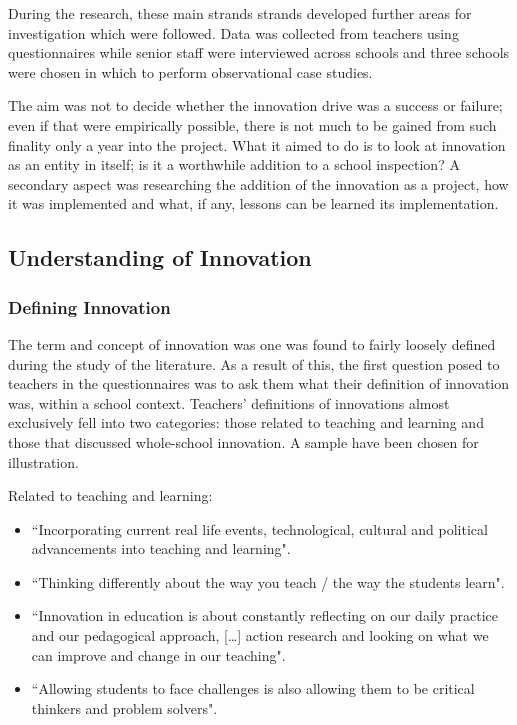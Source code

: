 \documentclass[11pt]{article}
\begin{document}
During the research, these main strands strands developed further areas for investigation which were followed. Data was collected from teachers using questionnaires while senior staff were interviewed across schools and three schools were chosen in which to perform observational case studies.

The aim was not to decide whether the innovation drive was a success or failure; even if that were empirically possible, there is not much to be gained from such finality only a year into the project. What it aimed to do is to look at innovation as an entity in itself; is it a worthwhile addition to a school inspection? A secondary aspect was researching the addition of the innovation as a project, how it was implemented and what, if any, lessons can be learned its implementation.

\subsection{Understanding of Innovation}
\subsubsection{Defining Innovation}
The term and concept of innovation was one was found to fairly loosely defined during the study of the literature. As a result of this, the first question posed to teachers in the questionnaires was to ask them what their definition of innovation was, within a school context. Teachers' definitions of innovations almost exclusively fell into two categories: those related to teaching and learning and those that discussed whole-school innovation. A sample have been chosen for illustration.

Related to teaching and learning: 

\begin{itemize}
	\item ``Incorporating current real life events, technological, cultural and political advancements into teaching and learning".
	\item ``Thinking differently about the way you teach / the way the students learn".
	\item ``Innovation in education is about constantly reflecting on our daily practice and our pedagogical approach, […] action research and looking on what we can improve and change in our teaching".
	\item ``Allowing students to face challenges is also allowing them to be critical thinkers and problem solvers".
\end{itemize}
\end{document}
